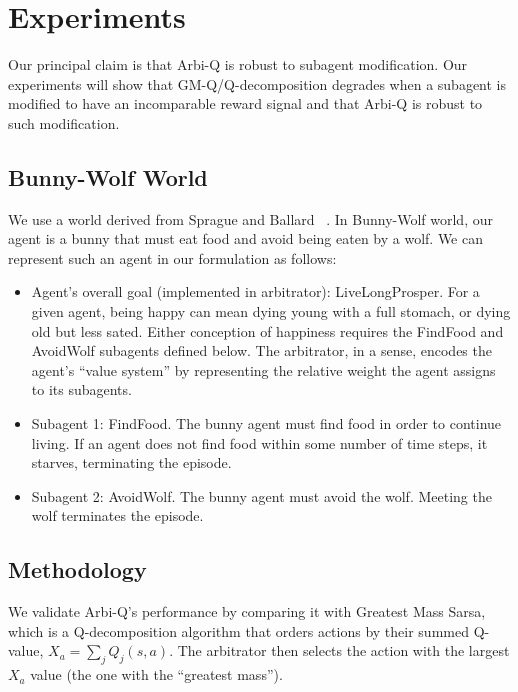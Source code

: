 \section{Experiments}

Our principal claim is that Arbi-Q is robust to subagent modification.  Our experiments will show that GM-Q/Q-decomposition degrades when a subagent is modified to have an incomparable reward signal and that Arbi-Q is robust to such modification.

\subsection{Bunny-Wolf World}

We use a world derived from Sprague and Ballard ~\cite{sprague2003multiple-goal}.  In Bunny-Wolf world, our agent is a bunny that must eat food and avoid being eaten by a wolf.  We can represent such an agent in our formulation as follows:

\begin{itemize}

\item Agent's overall goal (implemented in arbitrator):
  LiveLongProsper.  For a given agent, being happy can mean dying
  young with a full stomach, or dying old but less sated.  Either
  conception of happiness requires the FindFood and AvoidWolf
  subagents defined below.  The arbitrator, in a sense, encodes the
  agent's ``value system'' by representing the relative weight the
  agent assigns to its subagents.

\item Subagent 1: FindFood.  The bunny agent must find food in order
  to continue living.  If an agent does not find food within some
  number of time steps, it starves, terminating the episode.

\item Subagent 2: AvoidWolf.  The bunny agent must avoid the wolf.
  Meeting the wolf terminates the episode.

\end{itemize}

\subsection{Methodology}


We validate Arbi-Q's performance by comparing it with Greatest Mass Sarsa, which is a Q-decomposition algorithm that orders actions by their summed Q-value, $X_a=\sum_j Q_j(s,a)$. The arbitrator then selects the action with the largest $X_a$ value (the one with the
  ``greatest mass'').

